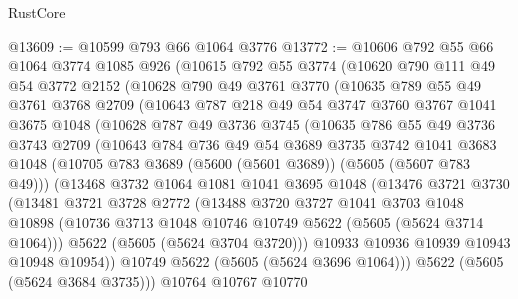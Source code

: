 \begin{lexlean}{RustCore}
\begin{coremodule}
@13609 := @10599 @793 @66 @1064 @3776
@13772 := @10606
    @792
    @55
    @66
    @1064
    @3774
    @1085
    @926
    (@10615
      @792
      @55
      @3774
      (@10620
        @790
        @111
        @49
        @54
        @3772
        @2152
        (@10628
          @790
          @49
          @3761
          @3770
          (@10635
            @789
            @55
            @49
            @3761
            @3768
            @2709
            (@10643
              @787
              @218
              @49
              @54
              @3747
              @3760
              @3767
              @1041
              @3675
              @1048
              (@10628
                @787
                @49
                @3736
                @3745
                (@10635
                  @786
                  @55
                  @49
                  @3736
                  @3743
                  @2709
                  (@10643
                    @784
                    @736
                    @49
                    @54
                    @3689
                    @3735
                    @3742
                    @1041
                    @3683
                    @1048
                    (@10705 @783 @3689 (@5600 (@5601 @3689)) (@5605 (@5607 @783 @49)))
                    (@13468
                      @3732
                      @1064
                      @1081
                      @1041
                      @3695
                      @1048
                      (@13476
                        @3721
                        @3730
                        (@13481
                          @3721
                          @3728
                          @2772
                          (@13488
                            @3720
                            @3727
                            @1041
                            @3703
                            @1048
                            @10898
                            (@10736 @3713 @1048 @10746 @10749 @5622 (@5605 (@5624 @3714 @1064)))
                            @5622
                            (@5605 (@5624 @3704 @3720)))
                          @10933
                          @10936
                          @10939
                          @10943
                          @10948
                          @10954))
                      @10749
                      @5622
                      (@5605 (@5624 @3696 @1064)))
                    @5622
                    (@5605 (@5624 @3684 @3735)))
                  @10764
                  @10767
                  @10770

\end{coremodule}
\end{lexlean}
